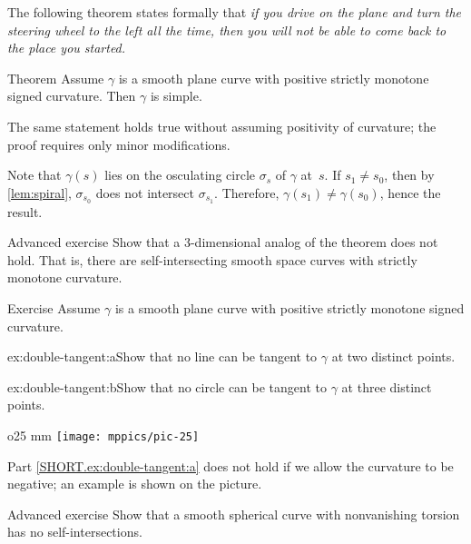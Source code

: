 The following theorem states formally that 
\textit{if you drive on the plane and turn the steering wheel to the left all the time,
then you will not be able to come back to the place you started.}


\begin{thm}{Theorem}\label{thm:spiral}
Assume $\gamma$ is a smooth plane curve with positive strictly monotone signed curvature. 
Then $\gamma$ is simple.
\end{thm}

The same statement holds true without assuming positivity of curvature; the proof requires only minor modifications.

Note that $\gamma(s)$ lies on the osculating circle $\sigma_s$ of $\gamma$ at~$s$.
If $s_1\ne s_0$, then by \ref{lem:spiral}, $\sigma_{s_0}$ does not intersect $\sigma_{s_1}$.
Therefore, $\gamma(s_1)\ne \gamma(s_0)$,
hence the result.\qeds

\begin{thm}{Advanced exercise}\label{ex:3D-spiral}
Show that a 3-dimensional analog of the theorem does not hold.
That is, there are self-intersecting smooth space curves with strictly monotone curvature.
\end{thm}

\begin{thm}{Exercise}\label{ex:double-tangent}
Assume $\gamma$ is a smooth plane curve with positive strictly monotone signed curvature.

\begin{subthm}{ex:double-tangent:a}Show that no line can be tangent to $\gamma$ at two distinct points.
\end{subthm}

\begin{subthm}{ex:double-tangent:b}Show that no circle can be tangent to $\gamma$ at three distinct points. 
\end{subthm}

\end{thm}

{

\begin{wrapfigure}{o}{25 mm}
\vskip-6mm
\centering
\texttt{[image: mppics/pic-25]}
\vskip0mm
\end{wrapfigure}

Part \ref{SHORT.ex:double-tangent:a} does not hold if we allow the curvature to be negative; an example is shown on the picture.

}

\begin{thm}{Advanced exercise}\label{ex:spherical-spiral}
Show that a smooth spherical curve with nonvanishing torsion has no self-intersections.
\end{thm}



